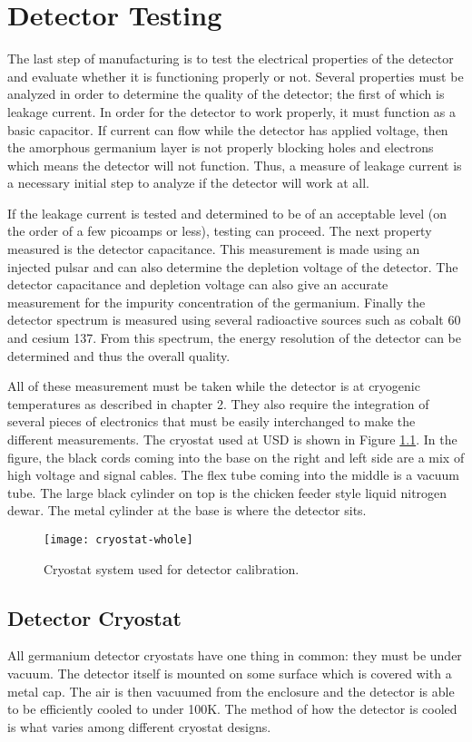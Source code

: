 \chapter{Detector Testing}
The last step of manufacturing is to test the electrical properties of the detector and evaluate whether it is functioning properly or not.
Several properties must be analyzed in order to determine the quality of the detector; the first of which is leakage current.
In order for the detector to work properly, it must function as a basic capacitor.
If current can flow while the detector has applied voltage, then the amorphous germanium layer is not properly blocking holes and electrons which means the detector will not function.
Thus, a measure of leakage current is a necessary initial step to analyze if the detector will work at all.

If the leakage current is tested and determined to be of an acceptable level (on the order of a few picoamps or less), testing can proceed.
The next property measured is the detector capacitance.
This measurement is made using an injected pulsar and can also determine the depletion voltage of the detector.
The detector capacitance and depletion voltage can also give an accurate measurement for the impurity concentration of the germanium.
Finally the detector spectrum is measured using several radioactive sources such as cobalt 60 and cesium 137.
From this spectrum, the energy resolution of the detector can be determined and thus the overall quality.

All of these measurement must be taken while the detector is at cryogenic temperatures as described in chapter 2.
They also require the integration of several pieces of electronics that must be easily interchanged to make the different measurements.
The cryostat used at USD is shown in Figure \ref{fig:cryostat-whole}.
In the figure, the black cords coming into the base on the right and left side are a mix of high voltage and signal cables.
The flex tube coming into the middle is a vacuum tube.
The large black cylinder on top is the chicken feeder style liquid nitrogen dewar.
The metal cylinder at the base is where the detector sits.
\begin{figure}[htpb]
\centering
\texttt{[image: cryostat-whole]}
\caption{Cryostat system used for detector calibration.}
\label{fig:cryostat-whole}
\end{figure}

\section{Detector Cryostat}
All germanium detector cryostats have one thing in common: they must be under vacuum.
The detector itself is mounted on some surface which is covered with a metal cap.
The air is then vacuumed from the enclosure and the detector is able to be efficiently cooled to under 100K.
The method of how the detector is cooled is what varies among different cryostat designs.


